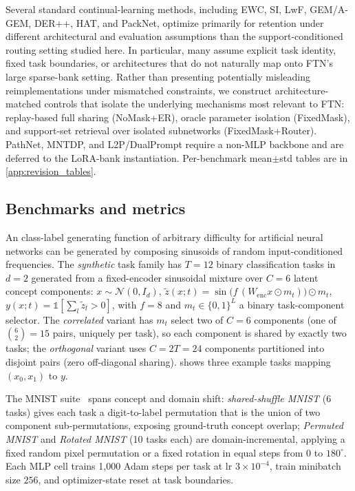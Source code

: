 \documentclass[11pt]{article}
\begin{document}
Several standard continual-learning methods, including EWC, SI, LwF, GEM/A-GEM, DER++, HAT, and PackNet, optimize primarily for retention under different architectural and evaluation assumptions than the support-conditioned routing setting studied here. In particular, many assume explicit task identity, fixed task boundaries, or architectures that do not naturally map onto FTN's large sparse-bank setting. Rather than presenting potentially misleading reimplementations under mismatched constraints, we construct architecture-matched controls that isolate the underlying mechanisms most relevant to FTN: replay-based full sharing (NoMask+ER), oracle parameter isolation (FixedMask), and support-set retrieval over isolated subnetworks (FixedMask+Router). PathNet, MNTDP, and L2P/DualPrompt require a non-MLP backbone and are deferred to the LoRA-bank instantiation. Per-benchmark mean$\pm$std tables are in \cref{app:revision_tables}.


\subsection{Benchmarks and metrics}\label{sec:setup}
An class-label generating function of arbitrary difficulty for artificial neural networks can be generated by composing sinusoids of random input-conditioned frequencies. The \emph{synthetic} task family has $T{=}12$ binary classification tasks in $d{=}2$ generated from a fixed-encoder sinusoidal mixture over $C{=}6$ latent concept components: $x \sim \mathcal{N}(0, I_d)$, $\tilde z(x; t) = \sin\!\bigl(f\,(W_\mathrm{enc} x \odot m_t)\bigr)\odot m_t$, $y(x;t)=\mathbb{1}[\sum_l \tilde z_l > 0]$, with $f{=}8$ and $m_t\in\{0,1\}^L$ a binary task-component selector. The \emph{correlated} variant has $m_t$ select two of $C{=}6$ components (one of $\binom{6}{2}{=}15$ pairs, uniquely per task), so each component is shared by exactly two tasks; the \emph{orthogonal} variant uses $C{=}2T{=}24$ components partitioned into disjoint pairs (zero off-diagonal sharing).  shows three example tasks mapping $(x_0, x_1)$ to $y$.

The MNIST suite~\citep{lecun1998mnist} spans concept and domain shift: \emph{shared-shuffle MNIST} (6 tasks) gives each task a digit-to-label permutation that is the union of two component sub-permutations, exposing ground-truth concept overlap; \emph{Permuted MNIST} and \emph{Rotated MNIST} (10 tasks each) are domain-incremental, applying a fixed random pixel permutation or a fixed rotation in equal steps from $0$ to $180^\circ$. Each MLP cell trains 1{,}000 Adam steps per task at lr $3{\times}10^{-4}$, train minibatch size $256$, and optimizer-state reset at task boundaries.
\end{document}
